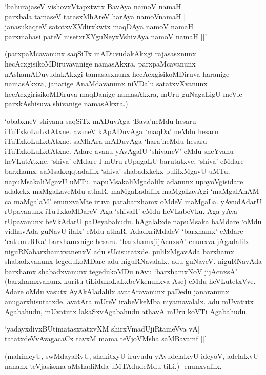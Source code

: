 \begin{shloka}
`bahurajaseV vishovxVtapxtwtx BavAya namoV namaH\\
parxbala tamaseV tatasxMhAreV harAya namoVnamaH‌ |\\
janasukaqteV satotxvXVdirxkwtx maqDAya namoV namaH\\
parxmahasi pateV nisetxrXYguNeyxVshivAya namoV namaH ||'
\end{shloka}

(parxpaMcavanunx saqSiTx mADuvudakAkxgi rajasasxnunx hecAcxgisikoMDiruvavanige namasAkxra. parxpaMcavanunx nAshamADuvudakAkxgi tamasasxnunx hecAcxgisikoMDiruva haranige namasAkxra, janarige AnaMdavanunx niVDalu satatxvXvanunx hecAcxgirisikoMDiruva maqDanige namasAkxra, mUru guNagaLigU meVle parxkAshisuva shivanige namasAkxra.)


`obabxneV shivanu saqSiTx mADuvAga `Bava'neMdu hesaru iTuTxkoLuLxtAtxne. avaneV kApADuvAga `maqDa' neMdu hesaru iTuTxkoLuLxtAtxne. saMhAra mADuvAga `hara'neMdu hesaru iTuTxkoLuLxtAtxne. Adare avanu yAvAgalU `shivaneV' eMdu sheYvanu heVLutAtxne. `shiva' eMdare I mUru rUpagaLU barutatxve. `shiva' eMdare barxhamx. saMsakxqqtadalilx `shiva' shabadxkekx pulilxMgavU uMTu, napuMsakaliMgavU uMTu. napuMsakaliMgadalilx adanunx upayoVgisidare adakekx maMgaLaveMdu athaR. maMgaLadalilx maMgaLavAgi `maMgalAnAM ca maMgalaM' enunxvaMte iruva parabarxhamx oMdeV maMgaLa. yAvudAdarU rUpavanunx iTuTxkoMDareV Aga `shivaH' eMdu heVLabeVku. Aga yAva rUpavanunx beVkAdarU paDeyabahudu. hAgalalxde napuMsaka baMdare `oMdu vidhavAda guNavU ilalx' eMdu athaR. AdadxriMdaleV `barxhamx' eMdare `catumuRKa' barxhamxnige hesaru. `barxhamxjijAcnxsA' enunxva jAgadalilx niguRNabarxhamxvanenxV adu sUcisutatxde. pulilxMgavAda barxhamx shabadxvanunx tegedukoMDare adu niguRNavalalx. adu guNaveV. niguRNavAda barxhamx shabadxvanunx tegedukoMDu nAvu `barxhamxNoV jijAcnxsA' (barxhamxvanunx kuritu tiLidukoLaLxbeVkenunxva Ase) eMdu heVLutetxVve. Adare oMdu vasutx AyAkAladalilx avatAravanunx paDedu janaranunx anugarxhisutatxde. avatAra mUreV irabeVkeMba niyamavalalx. adu mUvatutx Agabahudu, mUvatutx lakaSxvAgabahudu athavA mUru koVTi Agabahudu.

\begin{shloka}
`yadayxdivxBUtimatasxtatxvXM shirxVmadUjiRtameVva vA‌|\\
tatatxdeVvAvagacaCx tavxM mama teVjoVMsha saMBavamf ||'
\end{shloka}

(mahimeyU, swMdayaRvU, shakitxyU iruvudu yAvudelalxvU ideyoV, adelalxvU nananx teVjasisxna aMshadiMda uMTAdudeMdu tiLi.)- enunxvalilx,

